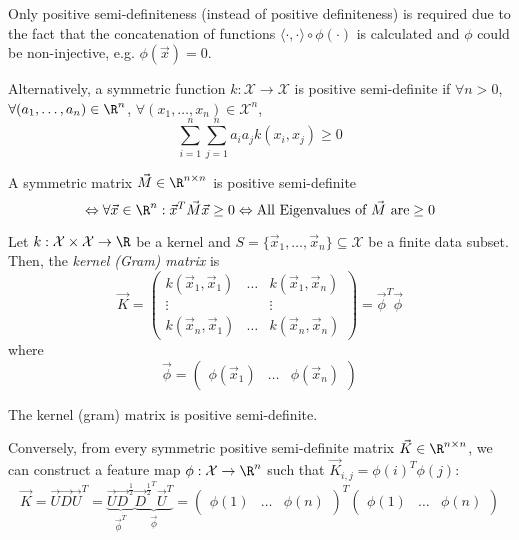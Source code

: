 Only positive semi-definiteness (instead of positive definiteness)
is required due to the fact that the concatenation of
functions $\langle \cdot, \cdot \rangle \circ \phi(\cdot)$
is calculated and $\phi$ could be non-injective,
e.g. $\phi(\vec{x}) = 0$.

Alternatively, a symmetric function $k : \mathcal{X} \to \mathcal{X}$
is positive semi-definite if
$\forall n > 0$,
$\forall (a_1, \dotsc, a_n) \in \R^n$,
$\forall (x_1, \dotsc, x_n) \in \mathcal{X}^n$,
\begin{equation*}
    \sum_{i=1}^n{
        \sum_{j=1}^n{
            a_i a_j k(x_i, x_j)
        }
    }
    \geq 0
\end{equation*}

A symmetric matrix $\vec{M} \in \R^{n \times n}$
is positive semi-definite
\begin{equation*}
    \Leftrightarrow \forall \vec{x} \in \R^n:
        \vec{x}^T \vec{M} \vec{x} \geq 0
    \Leftrightarrow
        \text{All Eigenvalues of $\vec{M}$ are} \geq 0
\end{equation*}

Let $k : \mathcal{X} \times \mathcal{X} \to \R$
be a kernel and $S = \{\vec{x}_1, \dotsc, \vec{x}_n\} \subseteq \mathcal{X}$
be a finite data subset.
Then, the \emph{kernel (Gram) matrix} is
\begin{equation*}
    \vec{K} =
    \begin{pmatrix}
    k(\vec{x}_1, \vec{x}_1) & \dots & k(\vec{x}_1, \vec{x}_n) \\
    \vdots & & \vdots \\
    k(\vec{x}_n, \vec{x}_1) & \dots & k(\vec{x}_n, \vec{x}_n)
    \end{pmatrix}
    = \vec{\phi}^T \vec{\phi}
\end{equation*}
where
\begin{equation*}
    \vec{\phi} =
    \left(
    \begin{array}{c|c|c}
    \phi(\vec{x}_1) & \dots & \phi(\vec{x}_n)
    \end{array}
    \right)
\end{equation*}

The kernel (gram) matrix is positive semi-definite.

Conversely, from every symmetric positive semi-definite
matrix $\vec{K} \in \R^{n \times n}$,
we can construct a feature map
$\phi : \mathcal{X} \to \R^n$ such that
$\vec{K}_{i,j} = \phi(i)^T \phi(j)$:
\begin{equation*}
    \vec{K} = \vec{U}\vec{D}\vec{U}^T
    = \underbrace{\vec{U} \vec{D}^{\frac{1}{2}}}_{\vec{\phi}^T}
    \underbrace{\vec{D}^{\frac{1}{2}^T} \vec{U}^T}_{\vec{\phi}}
    =
    \left(
    \begin{array}{c|c|c}
    \phi(1) & \dots & \phi(n)
    \end{array}
    \right)^T
    \left(
    \begin{array}{c|c|c}
    \phi(1) & \dots & \phi(n)
    \end{array}
    \right)
\end{equation*}

